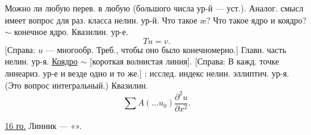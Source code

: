 Можно ли любую перев. в любую
(большого числа ур-й --- уст.).
Аналог. смысл имеет вопрос для раз. класса нелин. ур-й. Что такое æ?
Что такое ядро и коядро?
$\sim$ конечное ядро.
Квазилин. ур-е.
\begin{equation*}
Tu=v.
\end{equation*}
[Справа: $u$ --- многообр. Треб., чтобы оно было конечномерно.]
Главн. часть нелин. ур-я.
\underline{Коядро} $\sim$ [короткая волнистая линия].
[Справа: В кажд. точке линеариз. ур-е и везде одно и то же.]
: исслед. индекс нелин. эллиптич. ур-я.
(Это вопрос интегральный.)
Квазилин.
\begin{equation*}
\sum A(\ldots u_0)\frac{\partial^2u}{\partial x^2}.
\end{equation*}

\par\noindent\begin{minipage}{\linewidth}
\underline{\textcolor{orange!65!black}{16 го.}} Линник --- «».
\end{minipage}\par

